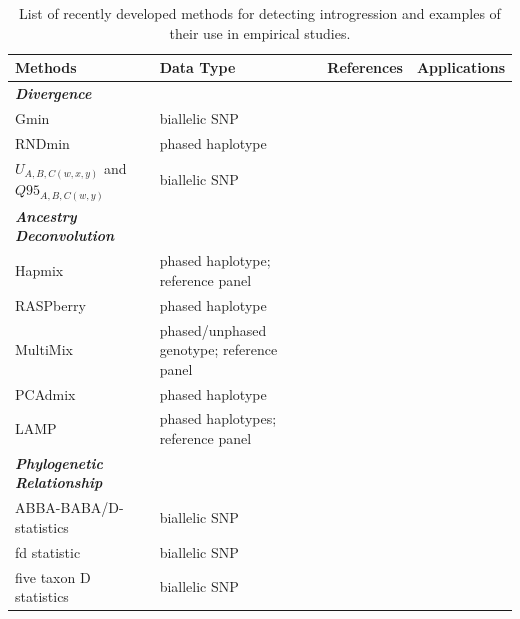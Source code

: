 \documentclass[11pt]{article}
\begin{document}
\begin{table}[h]

\begin{center}
\caption{List of recently developed methods for detecting introgression and examples of their use in empirical studies.} \label{tab:tools}
\begin{tabularx}{\textwidth}{llll}
\\\toprule  
\rowcolor{white}
{\bf Methods}	& {\bf Data Type } &	{\bf References} &  {\bf Applications } \\ \midrule

\rowcolor{gray!25}
{\emph{\bf Divergence}} &   &   &   \\
\rowcolor{gray!25}
Gmin &	biallelic SNP	&  \cite{geneva2015}	 &  \cite{kingan2015}\\
\rowcolor{gray!25}
RNDmin	& phased haplotype	& \cite{rosenzweig2016} &  \cite{roda2017} \\
\rowcolor{gray!25}
$U_{A,B,C(w,x,y)}$ and $Q95_{A,B,C(w,y)}$ & biallelic SNP & \cite{Racimo2015} & \cite{sams2016} \\

\rowcolor{white}
{\emph{\bf Ancestry Deconvolution}} &   &   &   \\
\rowcolor{white}
Hapmix	& phased haplotype; reference panel		& \cite{Price2009}	&  \cite{Hufford2013, suarez2016} \\ 
\rowcolor{white}
RASPberry &	phased haplotype &	\cite{wegmann2011}	 & \cite{christe2016} \\
\rowcolor{white}
MultiMix & phased/unphased genotype; reference panel &	\cite{churchhouse2013} &	\cite{eyheramendy2015} \\
\rowcolor{white}
PCAdmix	 & phased haplotype	 & \cite{brisbin2012pcadmix}	 &  \cite{pugach2016complex, moreno2014genetics} \\
\rowcolor{white}
LAMP  &	phased haplotypes; reference panel	 & \cite{sankararaman2008}	 & \cite{patterson2012} \\

\rowcolor{gray!25}
{\emph{\bf Phylogenetic Relationship}} &   &   &   \\
\rowcolor{gray!25}
ABBA-BABA/D-statistics	 & biallelic SNP  &	\cite{durand2011}	 &  \cite{heliconius2012} \\
\rowcolor{gray!25}
fd statistic &	biallelic SNP &	\cite{martin2015}  &	\cite{malinsky2015, zhang2016genome} \\ 
\rowcolor{gray!25}
five taxon D statistics	& biallelic SNP	&  \cite{pease2015}	& \cite{fontaine2015, pease2016} \\

\end{tabularx}
\end{center}
\end{table} 
\end{document}
